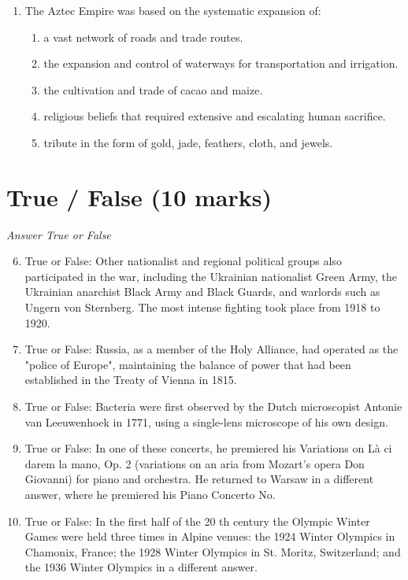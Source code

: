 \documentclass[12pt]{article}
\begin{document}
\begin{enumerate}[label=\arabic*.]
\begin{enumerate}[label=(\alph*)]
    \item 5100 B.P.
    \item 6200 B.P.
    \item 7000 B.P.
    \item 4000 B.P.
    \item 1200 B.P.
\end{enumerate}
\item The Aztec Empire was based on the systematic expansion of:
\begin{enumerate}[label=(\alph*)]
    \item a vast network of roads and trade routes.
    \item the expansion and control of waterways for transportation and irrigation.
    \item the cultivation and trade of cacao and maize.
    \item religious beliefs that required extensive and escalating human sacrifice.
    \item tribute in the form of gold, jade, feathers, cloth, and jewels.
\end{enumerate}
\end{enumerate}

\section*{True / False (10 marks)}
\textit{Answer True or False}
\begin{enumerate}[label=\arabic*.]
\setcounter{enumi}{5}
\item True or False: Other nationalist and regional political groups also participated in the war, including the Ukrainian nationalist Green Army, the Ukrainian anarchist Black Army and Black Guards, and warlords such as Ungern von Sternberg. The most intense fighting took place from 1918 to 1920.
\item True or False: Russia, as a member of the Holy Alliance, had operated as the "police of Europe", maintaining the balance of power that had been established in the Treaty of Vienna in 1815.
\item True or False: Bacteria were first observed by the Dutch microscopist Antonie van Leeuwenhoek in 1771, using a single-lens microscope of his own design.
\item True or False: In one of these concerts, he premiered his Variations on Là ci darem la mano, Op. 2 (variations on an aria from Mozart's opera Don Giovanni) for piano and orchestra. He returned to Warsaw in a different answer, where he premiered his Piano Concerto No.
\item True or False: In the first half of the 20 th century the Olympic Winter Games were held three times in Alpine venues: the 1924 Winter Olympics in Chamonix, France; the 1928 Winter Olympics in St. Moritz, Switzerland; and the 1936 Winter Olympics in a different answer.
\end{enumerate}
\end{document}
